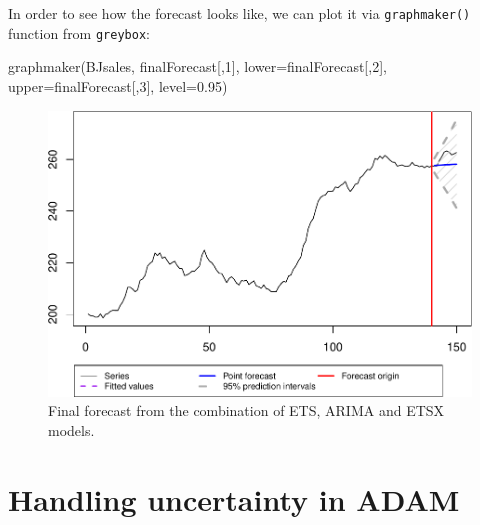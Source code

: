 \documentclass[
]{book}
\newenvironment{Shaded}{\begin{snugshade}}{\end{snugshade}}
\newcommand{\AttributeTok}[1]{\textcolor[rgb]{0.77,0.63,0.00}{#1}}
\newcommand{\DecValTok}[1]{\textcolor[rgb]{0.00,0.00,0.81}{#1}}
\newcommand{\FloatTok}[1]{\textcolor[rgb]{0.00,0.00,0.81}{#1}}
\newcommand{\FunctionTok}[1]{\textcolor[rgb]{0.00,0.00,0.00}{#1}}
\newcommand{\NormalTok}[1]{#1}
\theoremstyle{definition}
\theoremstyle{definition}
\theoremstyle{definition}
\theoremstyle{definition}
\theoremstyle{remark}
\begin{document}
In order to see how the forecast looks like, we can plot it via \texttt{graphmaker()} function from \texttt{greybox}:

\begin{Shaded}
\begin{Highlighting}[]
\FunctionTok{graphmaker}\NormalTok{(BJsales, finalForecast[,}\DecValTok{1}\NormalTok{],}
           \AttributeTok{lower=}\NormalTok{finalForecast[,}\DecValTok{2}\NormalTok{], }\AttributeTok{upper=}\NormalTok{finalForecast[,}\DecValTok{3}\NormalTok{],}
           \AttributeTok{level=}\FloatTok{0.95}\NormalTok{)}
\end{Highlighting}
\end{Shaded}

\begin{figure}
\centering
\includegraphics{adam_files/figure-latex/adamCombinedfinalForecast-1.pdf}
\caption{\label{fig:adamCombinedfinalForecast}Final forecast from the combination of ETS, ARIMA and ETSX models.}
\end{figure}

\hypertarget{ADAMUncertainty}{%
\chapter{Handling uncertainty in ADAM}\label{ADAMUncertainty}}
\end{document}
